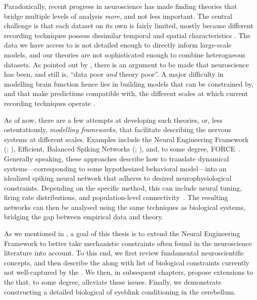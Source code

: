 Paradoxically, recent progress in neuroscience has made finding theories that bridge multiple levels of analysis \emph{more}, and not less important.
The central challenge is that each dataset on its own is fairly limited, mostly because different recording techniques possess dissimilar temporal and spatial characteristics \citep{sejnowski2014putting}.
The data we have access to is not detailed enough to directly inform large-scale models, and our theories are not sophisticated enough to combine heterogneous datasets. As pointed out by \citet{churchland1992computational}, there is an argument to be made that neuroscience has been, and still is, \enquote{data poor \emph{and} theory poor}.
A major difficulty in modelling brain function hence lies in building models that can be constrained by, and that make predictions compatible with, the different scales at which current recording techniques operate \citep[Chapter~9]{eliasmith2013how}.

As of now, there are a few attempts at developing such theories, or, less ostentatiously, \emph{modelling frameworks}, that facilitate describing the nervous systems at different scales.
Examples include the Neural Engineering Framework (\NEF; \cite{eliasmith2003neural}), Efficient, Balanced Spiking Networks (\EBN; \cite{boerlin2011spikebased,boerlin2013predictive}), and, to some degree, FORCE~\citep{sussillo2009generating,nicola2017supervised}.
Generally speaking, these approaches describe how to translate dynamical systems---corresponding to some hypothesized behavioral model---into an idealized spiking neural network that adheres to desired neurophysiological constraints.
Depending on the specific method, this can include neural tuning, firing rate distributions, and population-level connectivity~\citep{komer2016unified,nicola2017supervised}.
The resulting networks can then be analysed using the same techniques as biological systems, bridging the gap between empirical data and theory.

As we mentioned in , a goal of this thesis is to extend the Neural Engineering Framework to better take mechanistic constraints often found in the neuroscience literature into account.
To this end, we first review fundamental neuroscientific concepts, and then describe the \NEF along with list of biological constraints currently not well-captured by the \NEF.
We then, in subsequent chapters, propose extensions to the \NEF that, to some degree, alleviate these issues.
Finally, we demonstrate constructing a detailed biological of eyeblink conditioning in the cerebellum.
